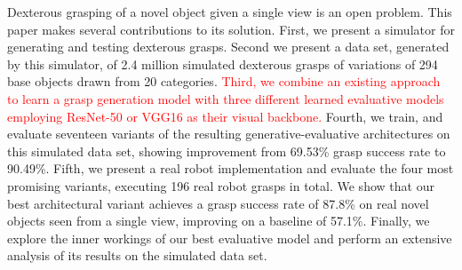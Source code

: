 Dexterous grasping of a novel object given a single view is an open problem. This paper makes several contributions to its solution. First, we present a simulator for generating and testing dexterous grasps. Second we present a data set, generated by  this simulator, of 2.4 million simulated dexterous grasps of variations of 294 base objects drawn from 20 categories. \textcolor{red}{Third, we combine an existing approach to learn a grasp generation model with three different learned evaluative models employing ResNet-50 or VGG16 as their visual backbone.} Fourth, we train, and evaluate seventeen variants of the resulting generative-evaluative architectures on this simulated data set, showing improvement from 69.53\% grasp success rate to 90.49\%. Fifth, we present a real robot implementation and evaluate the four most promising variants, executing 196 real robot grasps in total. We show that our best architectural variant achieves a grasp success rate of 87.8\% on real novel objects seen from a single view, improving on a baseline of 57.1\%. Finally, we explore the inner workings of our best evaluative model and perform an extensive analysis of its results on the simulated data set. 



